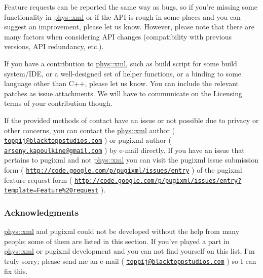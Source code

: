  \par
 Feature requests can be reported the same way as bugs, so if you're missing some functionality in \hyperlink{namespacephys_1_1xml}{phys::xml} or if the API is rough in some places and you can suggest an improvement, please let us know. However, please note that there are many factors when considering API changes (compatibility with previous versions, API redundancy, etc.). \par
 \par
 If you have a contribution to \hyperlink{namespacephys_1_1xml}{phys::xml}, such as build script for some build system/IDE, or a well-\/designed set of helper functions, or a binding to some language other than C++, please let us know. You can include the relevant patches as issue attachments. We will have to communicate on the Licensing terms of your contribution though. \par
 \par
 If the provided methods of contact have an issue or not possible due to privacy or other concerns, you can contact the \hyperlink{namespacephys_1_1xml}{phys::xml} author ( \href{mailto:toppij@blacktoppstudios.com}{\tt toppij@blacktoppstudios.com} ) or pugixml author ( \href{mailto:arseny.kapoulkine@gmail.com}{\tt arseny.kapoulkine@gmail.com} ) by e-\/mail directly. If you have an issue that pertains to pugixml and not \hyperlink{namespacephys_1_1xml}{phys::xml} you can visit the pugixml issue submission form ( \href{http://code.google.com/p/pugixml/issues/entry}{\tt http://code.google.com/p/pugixml/issues/entry} ) of the pugixml feature request form ( \href{http://code.google.com/p/pugixml/issues/entry?template=Feature%20request}{\tt http://code.google.com/p/pugixml/issues/entry?template=Feature\%20request} ). \hypertarget{XMLManual_XMLAcknowledgments}{}\subsubsection{Acknowledgments}\label{XMLManual_XMLAcknowledgments}
\hyperlink{namespacephys_1_1xml}{phys::xml} and pugixml could not be developed without the help from many people; some of them are listed in this section. If you've played a part in \hyperlink{namespacephys_1_1xml}{phys::xml} or pugixml development and you can not find yourself on this list, I'm truly sorry; please send me an e-\/mail ( \href{mailto:toppij@blacktoppstudios.com}{\tt toppij@blacktoppstudios.com} ) so I can fix this. \par
 \par
